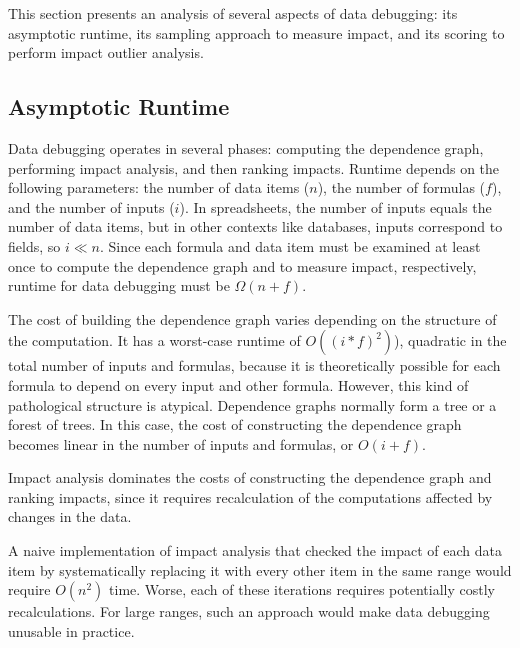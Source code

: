 
This section presents an analysis of several aspects of data
debugging: its asymptotic runtime, its sampling
approach to measure impact, and its scoring to perform impact outlier analysis.

\subsection{Asymptotic Runtime}
\label{sec:asymptotic_analysis}

Data debugging operates in several phases: computing the dependence
graph, performing impact analysis, and then ranking impacts. Runtime
depends on the following parameters: the number of data items ($n$),
the number of formulas ($f$), and the number of inputs ($i$). In
spreadsheets, the number of inputs equals the number of data items,
but in other contexts like databases, inputs correspond to fields, so
$i \ll n$. Since each formula and data item must be examined at least
once to compute the dependence graph and to measure impact,
respectively, runtime for data debugging must be 
$\Omega(n+f)$.

The cost of building the dependence graph varies depending on the
structure of the computation. It has a worst-case runtime of
$O((i*f)^2)$), quadratic in the total number of inputs and formulas,
because it is theoretically possible for each formula to depend on
every input and other formula. However, this kind of pathological
structure is atypical. Dependence graphs normally form a tree or a
forest of trees. In this case, the cost of constructing the dependence
graph becomes linear in the number of inputs and formulas, or
$O(i+f)$.

Impact analysis dominates the costs of constructing the dependence
graph and ranking impacts, since it requires recalculation of the
computations affected by changes in the data.

A naive implementation of impact analysis that checked the impact of
each data item by systematically replacing it with every other item in
the same range would require $O(n^2)$ time. Worse, each of these
iterations requires potentially costly recalculations. For large
ranges, such an approach would make data debugging unusable in
practice.
 
